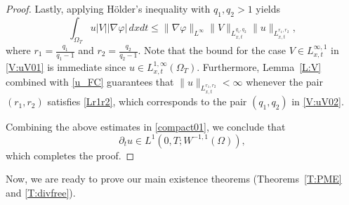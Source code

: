 \documentclass{amsart}
\numberwithin{equation}{section}
\begin{document}
\begin{proof}
Lastly, applying H\"{o}lder's inequality with $q_1, q_2 > 1$ yields
\begin{equation}\label{compact02}
	\int_{\Omega_T} u |V| |\nabla \varphi| \,dxdt
	\leq \|\nabla \varphi\|_{L^{\infty}} \|V\|_{L_{x,t}^{q_1,q_2}} \|u\|_{L_{x,t}^{r_1,r_2}}, 
\end{equation}
where $r_1 = \frac{q_1}{q_1 -1}$ and $r_2 = \frac{q_2}{q_2 -1}$.
Note that the bound for the case $V\in L_{x,t}^{\infty,1}$ in \eqref{V:uV01} is immediate since $u\in L_{x,t}^{1,\infty}(\Omega_{T})$.
Furthermore, Lemma~\ref{L:V} combined with \eqref{u_FC} guarantees that $\|u\|_{L_{x,t}^{r_1,r_2}} < \infty$ whenever the pair $(r_1, r_2)$ satisfies \eqref{Lr1r2}, which corresponds to the pair $(q_1, q_2)$ in \eqref{V:uV02}. 

Combining the above estimates in \eqref{compact01}, we conclude that 
\[
\partial_t u \in L^{1}(0,T;  W^{-1,1}(\Omega)),
\]
which completes the proof.
\end{proof}



Now, we are ready to prove our main existence theorems (Theorems~\ref{T:PME} and \ref{T:divfree}). 
\end{document}
